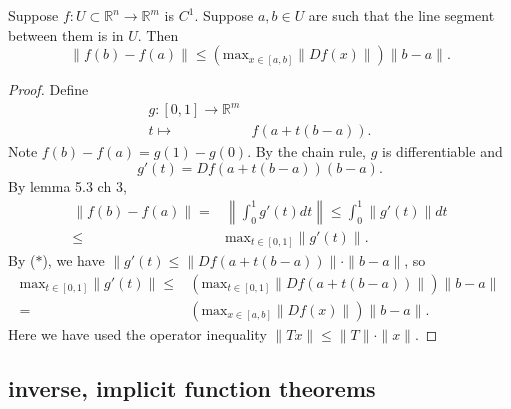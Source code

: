 \documentclass[12pt]{article}
\begin{document}
\begin{proposition}
	Suppose $f:U\subset\mathbb{R}^n\to\mathbb{R}^m$ is $C^1$. Suppose $a,b\in U$ are such that the line segment between them is in $U$. Then 
	\begin{equation*}
		\|f(b)-f(a)\| \leq \left( \text{max}_{x\in [a,b]} \|Df(x)\| \right) \|b-a\|.
	\end{equation*}
\end{proposition}
\begin{proof} 
	Define 
	\begin{align*}
		g:[0,1]\to \mathbb{R}^m \\
		t \mapsto& f(a+t(b-a)).
	\end{align*}
	Note $f(b)-f(a)=g(1)-g(0)$. By the chain rule, $g$ is differentiable and 
	\begin{equation*}
		g'(t) = Df(a+t(b-a))(b-a). \tag{$\ast$}
	\end{equation*}
	By lemma 5.3 ch 3, 
	\begin{align*}
		\|f(b)-f(a)\| 
		=& \left\| \int_0^1 g'(t)dt \right\| \leq \int_0^1 \|g'(t)\|dt \\
		\leq& \text{max}_{t\in [0,1]}\|g'(t)\|.
	\end{align*}
	By ($\ast$), we have $\|g'(t)\leq \|Df(a+t(b-a))\|\cdot \|b-a\|$, so 
	\begin{align*}
		\text{max}_{t\in [0,1]}\|g'(t)\| 
		\leq& \left( \text{max}_{t\in [0,1]} \|Df(a+t(b-a))\| \right) \|b-a\| \\
		=& \left( \text{max}_{x\in [a,b]} \|Df(x)\| \right) \|b-a\|.
	\end{align*}
	Here we have used the operator inequality $\|Tx\|\leq \|T\|\cdot \|x\|$.
\end{proof}	


\subsection{inverse, implicit function theorems} %
\end{document}
